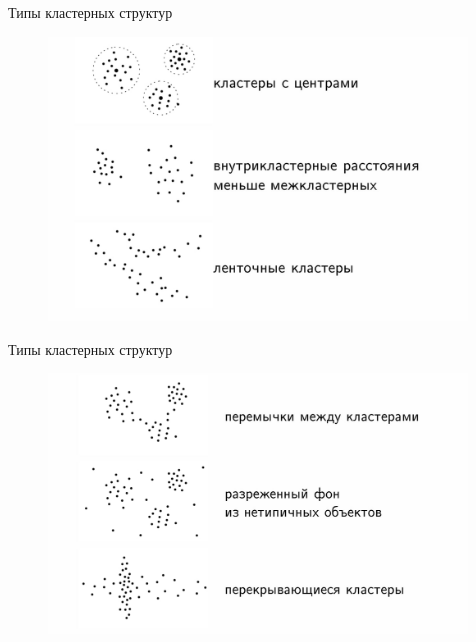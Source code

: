 \documentclass[unicode, notheorems, handout]{beamer}
\begin{document}
\begin{frame}{Типы кластерных структур}
    \begin{figure}[h]
      \centering
    \includegraphics[width=0.99\textwidth]{clust1.jpg} 
    \end{figure}
\end{frame}

\begin{frame}{Типы кластерных структур}
    \begin{figure}[h]
      \centering
    \includegraphics[width=0.99\textwidth]{clust2.jpg} 
    \end{figure}
\end{frame}
\end{document}
